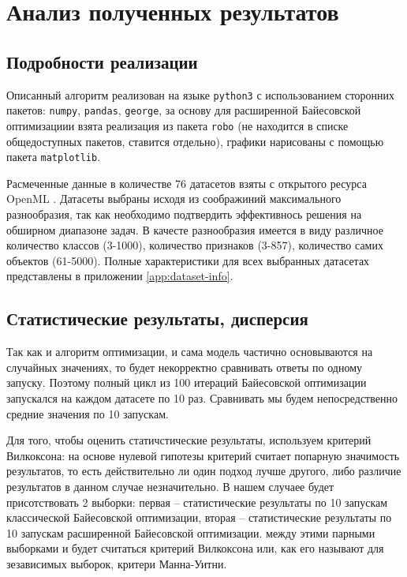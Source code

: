 \documentclass[times,specification,annotation]{itmo-student-thesis}
\begin{document}
	\chapter{Анализ полученных результатов}
	\section{Подробности реализации}
	Описанный алгоритм реализован на языке \texttt{python3} с использованием сторонних пакетов: \texttt{numpy}, \texttt{pandas}, \texttt{george}, за основу для расширенной Байесовской оптимизациии взята реализация из пакета \texttt{robo} (не находится в списке общедоступных пакетов, ставится отдельно), графики нарисованы с помощью пакета \texttt{matplotlib}. \par 
	
	Расмеченные данные в количестве 76 датасетов взяты с открытого ресурса OpenML \cite{OpenML2013}. Датасеты выбраны исходя из соображиний максимального разнообразия, так как необходимо подтвердить эффективнось решения на обширном диапазоне задач. В качесте разнообразия имеется в виду различное количество классов (3-1000), количество признаков (3-857), количество самих объектов (61-5000). Полные характеристики для всех выбранных датасетах представлены в приложении \ref{app:dataset-info}. 
	
	\section{Статистические результаты, дисперсия} \label{s:cox}
	Так как и алгоритм оптимизации, и сама модель частично основываются на случайных значениях, то будет некорректно сравнивать ответы по одному запуску. Поэтому полный цикл из 100 итераций Байесовской оптимизации запускался на каждом датасете по 10 раз. Сравнивать мы будем непосредственно средние значения по 10 запускам. \par 
	
	Для того, чтобы оценить статичстические результаты, используем критерий Вилкоксона\cite{Neuhäuser2011}:  \label{df:cox} на основе нулевой гипотезы критерий считает попарную значимость результатов, то есть действительно ли один подход лучше другого, либо различие результатов в данном случае незначительно. В нашем случаее будет присотствовать 2 выборки: первая -- статистические результаты по 10 запускам классической Байесовской оптимизации, вторая --  статистические результаты по 10 запускам расширенной Байесовской оптимизации. между этими парными выборками и будет считаться критерий Вилкоксона или, как его называют для зезависимых выборок, критери Манна-Уитни\cite{mann1947}. 
	\par 
	
\end{document}

